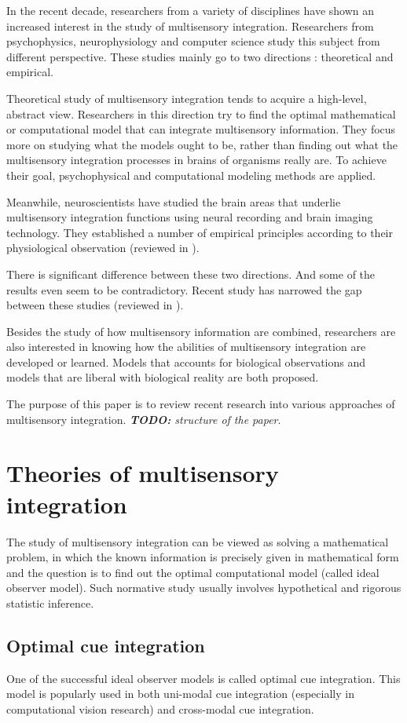 \documentclass{article}[11pt]
\newcommand{\TODO}[1]{\emph{\small{{\bf TODO: } #1}}}
\begin{document}
In the recent decade, researchers from a variety of disciplines have shown an increased interest in the study of multisensory integration.
Researchers from psychophysics, neurophysiology and computer science study this subject from different perspective.
These studies mainly go to two directions : theoretical and empirical.

Theoretical study of multisensory integration tends to acquire a high-level, abstract view. Researchers in this direction try to find the optimal mathematical or computational model that can integrate multisensory information. They focus more on studying what the models ought to be, rather than finding out what the multisensory integration processes in brains of organisms really are.
To achieve their goal, psychophysical and computational modeling methods are applied.

Meanwhile, neuroscientists have studied the brain areas that underlie multisensory integration functions using neural recording and brain imaging technology. They established a number of empirical principles according to their physiological observation (reviewed in \cite{stein_multisensory_2008}).

There is significant difference between these two directions. And some of the results even seem to be contradictory. Recent study has narrowed the gap between these studies (reviewed in \cite{fetsch_bridging_2013}).

Besides the study of how multisensory information are combined, researchers are also interested in knowing how the abilities of multisensory integration are developed or learned. Models that accounts for biological observations and models that are liberal with biological reality are both proposed.

The purpose of this paper is to review recent research into various approaches of multisensory integration.
\TODO{structure of the paper}.

\section{Theories of multisensory integration}
The study of multisensory integration can be viewed as solving a mathematical problem, in which the known information is precisely given in mathematical form and the question is to find out the optimal computational model (called ideal observer model). Such normative study usually involves hypothetical and rigorous statistic inference.

\subsection{Optimal cue integration}
One of the successful ideal observer models is called optimal cue integration\cite{geisler_contributions_2011}. This model is popularly used in both uni-modal cue integration (especially in computational vision research) and cross-modal cue integration.
\end{document}
